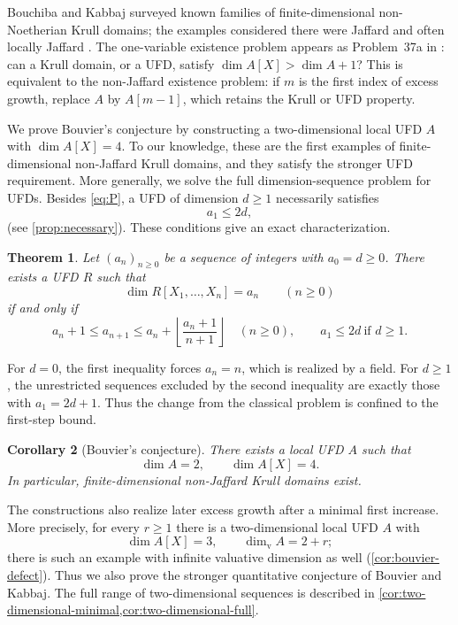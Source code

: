 \documentclass[11pt,reqno]{amsart}
\numberwithin{equation}{section}
\theoremstyle{plain}
\newtheorem{theorem}{Theorem}[section]
\newtheorem{corollary}[theorem]{Corollary}
\theoremstyle{definition}
\theoremstyle{remark}
\begin{document}
Bouchiba and Kabbaj surveyed known families of finite-dimensional
non-Noetherian Krull domains; the examples considered there were
Jaffard and often locally Jaffard
\cite{BouchibaKabbaj2009}.
The one-variable existence problem appears as Problem~37a in
\cite{CahenFontanaFrischGlaz2014}: can a Krull domain, or a UFD,
satisfy \(\dim A[X]>\dim A+1\)?
This is equivalent to the non-Jaffard existence problem: if
\(m\) is the first index of excess growth, replace \(A\) by
\(A[m-1]\), which retains the Krull or UFD property.

We prove Bouvier's conjecture by constructing a two-dimensional
local UFD \(A\) with \(\dim A[X]=4\). To our knowledge, these
are the first examples of finite-dimensional non-Jaffard Krull
domains, and they satisfy the stronger UFD requirement.
More generally, we solve the full dimension-sequence problem for UFDs.
Besides \eqref{eq:P},
a UFD of dimension \(d\ge1\) necessarily satisfies
\begin{equation}\label{eq:K}
 a_1\le2d,
\end{equation}
(see \cref{prop:necessary}). These conditions give an exact characterization.

\begin{theorem}\label{thm:main}
Let \((a_n)_{n\ge0}\) be a sequence of integers with
\(a_0=d\ge0\). There exists a UFD \(R\) such that
\[
 \dim R[X_1,\ldots,X_n]=a_n\qquad(n\ge0)
\]
if and only if
\[
 a_n+1\le a_{n+1}\le
 a_n+\left\lfloor\frac{a_n+1}{n+1}\right\rfloor
 \quad(n\ge0),
 \qquad a_1\le2d\ \text{if }d\ge1.
\]
\end{theorem}

For \(d=0\), the first inequality forces \(a_n=n\), which is realized
by a field. For \(d\ge1\), the unrestricted sequences excluded
by the second inequality are exactly those with \(a_1=2d+1\).
Thus the change from the classical problem is confined to the
first-step bound.

\begin{corollary}[Bouvier's conjecture]\label{cor:bouvier}
There exists a local UFD \(A\) such that
\[
 \dim A=2,\qquad \dim A[X]=4.
\]
In particular, finite-dimensional non-Jaffard Krull domains exist.
\end{corollary}

The constructions also realize later excess growth after a minimal
first increase. More precisely, for every \(r\ge1\) there is
a two-dimensional local UFD \(A\) with
\[
 \dim A[X]=3,\qquad \dim_{\mathrm v}A=2+r;
\]
there is such an example with infinite valuative dimension as well
(\cref{cor:bouvier-defect}). Thus we also prove the stronger
quantitative conjecture of Bouvier and Kabbaj. The full range of two-dimensional
sequences is described in \cref{cor:two-dimensional-minimal,cor:two-dimensional-full}.
\end{document}
